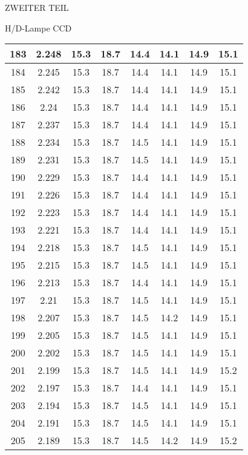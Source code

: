 \begin{appendix}
\begin{chapter}{ZWEITER TEIL}
\begin{section}{H/D-Lampe CCD}
\begin{scriptsize}
\begin{longtable}[htbp]{|c|c|c|c|c|c|c|c|}
            183 & 2.248 & 15.3 & 18.7 & 14.4 & 14.1 & 14.9 & 15.1 \\ \hline
            184 & 2.245 & 15.3 & 18.7 & 14.4 & 14.1 & 14.9 & 15.1 \\ \hline
            185 & 2.242 & 15.3 & 18.7 & 14.4 & 14.1 & 14.9 & 15.1 \\ \hline
            186 & 2.24 & 15.3 & 18.7 & 14.4 & 14.1 & 14.9 & 15.1 \\ \hline
            187 & 2.237 & 15.3 & 18.7 & 14.4 & 14.1 & 14.9 & 15.1 \\ \hline
            188 & 2.234 & 15.3 & 18.7 & 14.5 & 14.1 & 14.9 & 15.1 \\ \hline
            189 & 2.231 & 15.3 & 18.7 & 14.5 & 14.1 & 14.9 & 15.1 \\ \hline
            190 & 2.229 & 15.3 & 18.7 & 14.4 & 14.1 & 14.9 & 15.1 \\ \hline
            191 & 2.226 & 15.3 & 18.7 & 14.4 & 14.1 & 14.9 & 15.1 \\ \hline
            192 & 2.223 & 15.3 & 18.7 & 14.4 & 14.1 & 14.9 & 15.1 \\ \hline
            193 & 2.221 & 15.3 & 18.7 & 14.4 & 14.1 & 14.9 & 15.1 \\ \hline
            194 & 2.218 & 15.3 & 18.7 & 14.5 & 14.1 & 14.9 & 15.1 \\ \hline
            195 & 2.215 & 15.3 & 18.7 & 14.5 & 14.1 & 14.9 & 15.1 \\ \hline
            196 & 2.213 & 15.3 & 18.7 & 14.4 & 14.1 & 14.9 & 15.1 \\ \hline
            197 & 2.21 & 15.3 & 18.7 & 14.5 & 14.1 & 14.9 & 15.1 \\ \hline
            198 & 2.207 & 15.3 & 18.7 & 14.5 & 14.2 & 14.9 & 15.1 \\ \hline
            199 & 2.205 & 15.3 & 18.7 & 14.5 & 14.1 & 14.9 & 15.1 \\ \hline
            200 & 2.202 & 15.3 & 18.7 & 14.5 & 14.1 & 14.9 & 15.1 \\ \hline
            201 & 2.199 & 15.3 & 18.7 & 14.5 & 14.1 & 14.9 & 15.2 \\ \hline
            202 & 2.197 & 15.3 & 18.7 & 14.4 & 14.1 & 14.9 & 15.1 \\ \hline
            203 & 2.194 & 15.3 & 18.7 & 14.5 & 14.1 & 14.9 & 15.1 \\ \hline
            204 & 2.191 & 15.3 & 18.7 & 14.5 & 14.1 & 14.9 & 15.1 \\ \hline
            205 & 2.189 & 15.3 & 18.7 & 14.5 & 14.2 & 14.9 & 15.2 \\ \hline

\end{longtable}
\end{scriptsize}
\end{section}
\end{chapter}
\end{appendix}
